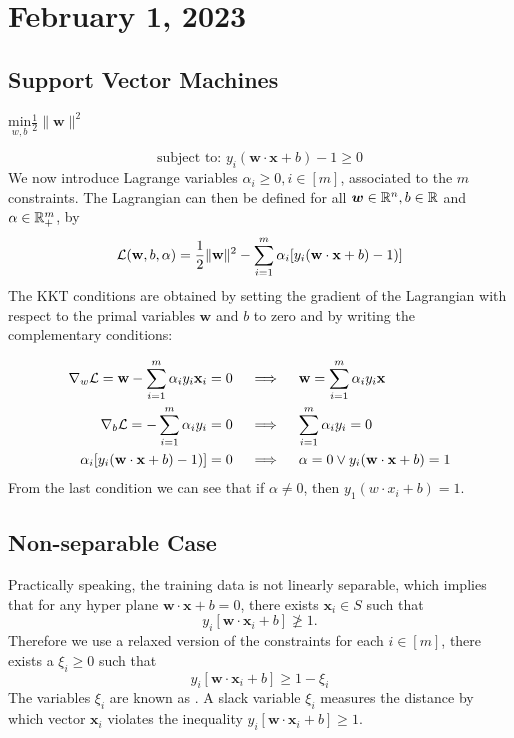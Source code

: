 \section{February 1, 2023}
\subsection{Support Vector Machines}
\centerline{$\underset{w,b}{\text{min}} \frac{1}{2} \|\mathbf{w}\|^2 $}
$$\text{subject to: } y_i(\mathbf w \cdot \mathbf x + b) - 1 \geq 0$$
We now introduce Lagrange variables $\alpha_i \geq 0, i \in [m]$, associated to the $m$ constraints. The Lagrangian can then be defined for all $\boldsymbol w \in \mathbb R^n, b \in \mathbb R$ and $\alpha \in \mathbb R^m_{+}$, by 
$$
\mathcal L(\mathbf{w},b,\alpha) = \frac{1}{2} \|\mathbf{w}\|^2 - 
\sum_{i=1}^{m}\alpha_i [y_i(\mathbf{w} \cdot \mathbf x + b) - 1)]
$$
The KKT conditions are obtained by setting the gradient of the Lagrangian with respect to the primal variables $\mathbf{w}$ and $b$ to zero and by writing the complementary conditions:

\begin{align*}
    \nabla_{w} \mathcal L = \mathbf{w} - \sum_{i=1}^{m}\alpha_i y_i \mathbf{x}_i = 0 \quad &\implies \quad \mathbf{w} = \sum_{i=1}^{m}\alpha_i y_i \mathbf{x} \\
    \nabla_{b} \mathcal L = -\sum_{i=1}^{m}\alpha_i y_i = 0 \quad
    &\implies \quad
    \sum_{i=1}^{m}\alpha_i y_i = 0 \\
    \alpha_i [y_i(\mathbf{w} \cdot \mathbf x + b) - 1)] = 0 \quad &\implies \quad \alpha = 0 \lor y_i(\mathbf{w} \cdot \mathbf x + b) = 1
\end{align*}
From the last condition we can see that if $\alpha \neq 0$, then $y_1(w \cdot x_i +b ) =1$. 

\subsection{Non-separable Case}
Practically speaking, the training data is not linearly separable, which implies that  for any hyper plane $\mathbf{w} \cdot \mathbf{x} +b =0$, there exists $\mathbf{x}_i \in S$ such that
$$
y_i[\mathbf{w} \cdot \mathbf{x}_i +b] \ngeq 1.
$$
Therefore we use a relaxed version of the constraints for each $i \in [m]$, there exists a $\xi_{i} \geq 0$ such that 
$$
y_i[\mathbf{w} \cdot \mathbf{x}_i +b] \geq 1 - \xi_i
$$
The variables $\xi_i$ are known as . A slack variable $\xi_{i}$ measures the distance by which vector 
$\mathbf{x}_i$ violates the inequality $y_i[\mathbf{w} \cdot \mathbf{x}_i +b] \geq 1$.

